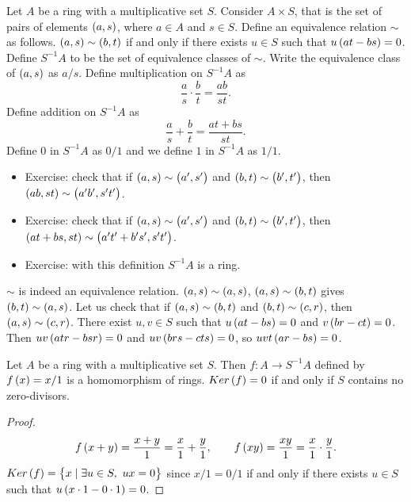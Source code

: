 \begin{definition}
Let $ A $ be a ring with a multiplicative set $ S $. Consider $ A \times S $, that is the set of pairs of elements $ \br{a, s} $, where $ a \in A $ and $ s \in S $. Define an equivalence relation $ \sim $ as follows. $ \br{a, s} \sim \br{b, t} $ if and only if there exists $ u \in S $ such that $ u\br{at - bs} = 0 $. Define $ S^{-1}A $ to be the set of equivalence classes of $ \sim $. Write the equivalence class of $ \br{a, s} $ as $ a / s $. Define multiplication on $ S^{-1}A $ as
$$ \dfrac{a}{s} \cdot \dfrac{b}{t} = \dfrac{ab}{st}. $$
Define addition on $ S^{-1}A $ as
$$ \dfrac{a}{s} + \dfrac{b}{t} = \dfrac{at + bs}{st}. $$
Define $ 0 $ in $ S^{-1}A $ as $ 0 / 1 $ and we define $ 1 $ in $ S^{-1}A $ as $ 1 / 1 $.
\begin{itemize}
\item Exercise: check that if $ \br{a, s} \sim \br{a', s'} $ and $ \br{b, t} \sim \br{b', t'} $, then $ \br{ab, st} \sim \br{a'b', s't'} $.
\item Exercise: check that if $ \br{a, s} \sim \br{a', s'} $ and $ \br{b, t} \sim \br{b', t'} $, then $ \br{at + bs, st} \sim \br{a't' + b's', s't'} $.
\item Exercise: with this definition $ S^{-1}A $ is a ring.
\end{itemize}
\end{definition}

\begin{remark}
$ \sim $ is indeed an equivalence relation. $ \br{a, s} \sim \br{a, s} $, $ \br{a, s} \sim \br{b, t} $ gives $ \br{b, t} \sim \br{a, s} $. Let us check that if $ \br{a, s} \sim \br{b, t} $ and $ \br{b, t} \sim \br{c, r} $, then $ \br{a, s} \sim \br{c, r} $. There exist $ u, v \in S $ such that $ u\br{at - bs} = 0 $ and $ v\br{br - ct} = 0 $. Then $ uv\br{atr - bsr} = 0 $ and $ uv\br{brs - cts} = 0 $, so $ uvt\br{ar - bs} = 0 $.
\end{remark}

\begin{lemma}
Let $ A $ be a ring with a multiplicative set $ S $. Then $ f : A \to S^{-1}A $ defined by $ f\br{x} = x / 1 $ is a homomorphism of rings. $ Ker\br{f} = 0 $ if and only if $ S $ contains no zero-divisors.
\end{lemma}

\begin{proof}
$$ f\br{x + y} = \dfrac{x + y}{1} = \dfrac{x}{1} + \dfrac{y}{1}, \qquad f\br{xy} = \dfrac{xy}{1} = \dfrac{x}{1} \cdot \dfrac{y}{1}. $$
$ Ker\br{f} = \cbr{x \mid \exists u \in S, \ ux = 0} $ since $ x / 1 = 0 / 1 $ if and only if there exists $ u \in S $ such that $ u\br{x \cdot 1 - 0 \cdot 1} = 0 $.
\end{proof}

